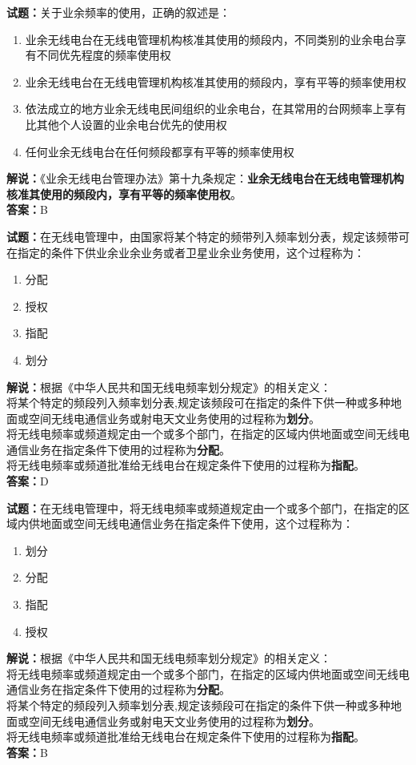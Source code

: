 \documentclass{ctexbook}
\begin{document}
\bigskip

\noindent\textbf{试题：}关于业余频率的使用，正确的叙述是：
\begin{enumerate}[leftmargin=3em]
  \item 业余无线电台在无线电管理机构核准其使用的频段内，不同类别的业余电台享有不同优先程度的频率使用权
  \item 业余无线电台在无线电管理机构核准其使用的频段内，享有平等的频率使用权
  \item 依法成立的地方业余无线电民间组织的业余电台，在其常用的台网频率上享有比其他个人设置的业余电台优先的使用权
  \item 任何业余无线电台在任何频段都享有平等的频率使用权
\end{enumerate}
\noindent\textbf{解说：}《业余无线电台管理办法》第十九条规定：\textbf{业余无线电台在无线电管理机构核准其使用的频段内，享有平等的频率使用权}。\\\noindent\textbf{答案：}B

\bigskip

\noindent\textbf{试题：}在无线电管理中，由国家将某个特定的频带列入频率划分表，规定该频带可在指定的条件下供业余业余业务或者卫星业余业务使用，这个过程称为：
\begin{enumerate}[leftmargin=3em]
  \item 分配
  \item 授权
  \item 指配
  \item 划分
\end{enumerate}
\noindent\textbf{解说：}根据《中华人民共和国无线电频率划分规定》的相关定义：\\将某个特定的频段列入频率划分表,规定该频段可在指定的条件下供一种或多种地面或空间无线电通信业务或射电天文业务使用的过程称为\textbf{划分}。\\将无线电频率或频道规定由一个或多个部门，在指定的区域内供地面或空间无线电通信业务在指定条件下使用的过程称为\textbf{分配}。\\将无线电频率或频道批准给无线电台在规定条件下使用的过程称为\textbf{指配}。\\
\textbf{答案：}D

\bigskip

\noindent\textbf{试题：}在无线电管理中，将无线电频率或频道规定由一个或多个部门，在指定的区域内供地面或空间无线电通信业务在指定条件下使用，这个过程称为：
\begin{enumerate}[leftmargin=3em]
  \item 划分
  \item 分配
  \item 指配
  \item 授权
\end{enumerate}
\noindent\textbf{解说：}根据《中华人民共和国无线电频率划分规定》的相关定义：\\将无线电频率或频道规定由一个或多个部门，在指定的区域内供地面或空间无线电通信业务在指定条件下使用的过程称为\textbf{分配}。\\将某个特定的频段列入频率划分表,规定该频段可在指定的条件下供一种或多种地面或空间无线电通信业务或射电天文业务使用的过程称为\textbf{划分}。\\将无线电频率或频道批准给无线电台在规定条件下使用的过程称为\textbf{指配}。\\
\textbf{答案：}B
\end{document}
